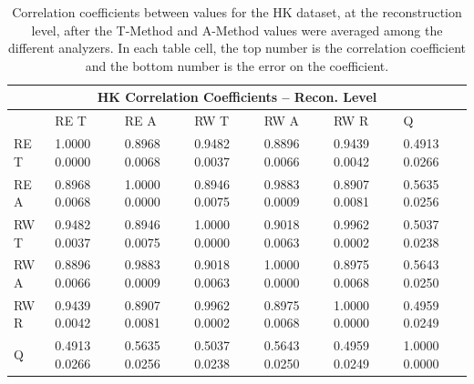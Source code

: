 \begin{table}
\setlength\tabcolsep{15pt}
\footnotesize
\centering
\renewcommand{\arraystretch}{1.4}
\begin{tabularx}{0.8\linewidth}{@{\extracolsep{\fill}}lXXXXXX}
  \toprule
  	\multicolumn{7}{c}{{\normalsize HK Correlation Coefficients -- Recon. Level}} \\
  \midrule
  	       & RE T & RE A & RW T & RW A & RW R & \quad Q \\
  \midrule
	RE T   & 1.0000 0.0000 & 0.8968 0.0068 & 0.9482 0.0037 & 0.8896 0.0066 & 0.9439 0.0042 & 0.4913 0.0266  \\
	RE A   & 0.8968 0.0068 & 1.0000 0.0000 & 0.8946 0.0075 & 0.9883 0.0009 & 0.8907 0.0081 & 0.5635 0.0256  \\
	RW T   & 0.9482 0.0037 & 0.8946 0.0075 & 1.0000 0.0000 & 0.9018 0.0063 & 0.9962 0.0002 & 0.5037 0.0238  \\
	RW A   & 0.8896 0.0066 & 0.9883 0.0009 & 0.9018 0.0063 & 1.0000 0.0000 & 0.8975 0.0068 & 0.5643 0.0250  \\
	RW R   & 0.9439 0.0042 & 0.8907 0.0081 & 0.9962 0.0002 & 0.8975 0.0068 & 1.0000 0.0000 & 0.4959 0.0249  \\
	Q      & 0.4913 0.0266 & 0.5635 0.0256 & 0.5037 0.0238 & 0.5643 0.0250 & 0.4959 0.0249 & 1.0000 0.0000  \\
  \bottomrule
\end{tabularx}
\caption[]{Correlation coefficients between \R values for the HK dataset, at the reconstruction level, after the \RW T-Method and A-Method \R values were averaged among the different analyzers. In each table cell, the top number is the correlation coefficient and the bottom number is the error on the coefficient.}
\label{tab:Corrs_HK_recon}
\end{table}


